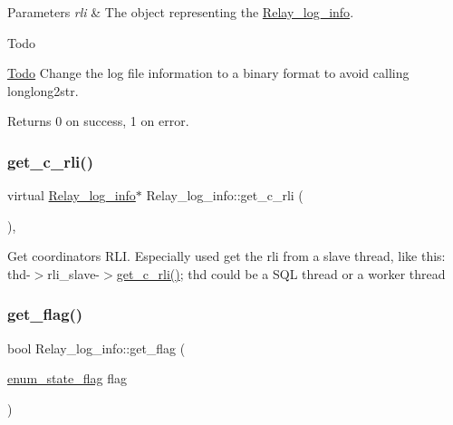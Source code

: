 \begin{DoxyParams}{Parameters}
{\em rli} & The object representing the \mbox{\hyperlink{classRelay__log__info}{Relay\+\_\+log\+\_\+info}}.\\
\hline
\end{DoxyParams}
\begin{DoxyRefDesc}{Todo}
\item[\mbox{\hyperlink{todo__todo000064}{Todo}}]Change the log file information to a binary format to avoid calling longlong2str.\end{DoxyRefDesc}


\begin{DoxyReturn}{Returns}
0 on success, 1 on error. 
\end{DoxyReturn}
\mbox{\label{classRelay__log__info_a2c69ad8016761856f3bcf2851949e39b}} 
\subsubsection{\texorpdfstring{get\+\_\+c\+\_\+rli()}{get\_c\_rli()}}
{\footnotesize\ttfamily virtual \mbox{\hyperlink{classRelay__log__info}{Relay\+\_\+log\+\_\+info}}$\ast$ Relay\+\_\+log\+\_\+info\+::get\+\_\+c\+\_\+rli (\begin{DoxyParamCaption}{ }\end{DoxyParamCaption})\hspace{0.3cm}{\ttfamily [inline]}, {\ttfamily [virtual]}}

Get coordinator\textquotesingle{}s R\+LI. Especially used get the rli from a slave thread, like this\+: thd-\/$>$rli\+\_\+slave-\/$>$\mbox{\hyperlink{classRelay__log__info_a2c69ad8016761856f3bcf2851949e39b}{get\+\_\+c\+\_\+rli()}}; thd could be a S\+QL thread or a worker thread \mbox{\label{classRelay__log__info_ac43e0aa4092c8731d462502ca57e3a58}} 
\subsubsection{\texorpdfstring{get\+\_\+flag()}{get\_flag()}}
{\footnotesize\ttfamily bool Relay\+\_\+log\+\_\+info\+::get\+\_\+flag (\begin{DoxyParamCaption}\item[{\mbox{\hyperlink{classRelay__log__info_a768d1f6426a20be0e32d7380a231c0b2}{enum\+\_\+state\+\_\+flag}}}]{flag }\end{DoxyParamCaption})\hspace{0.3cm}{\ttfamily [inline]}}

